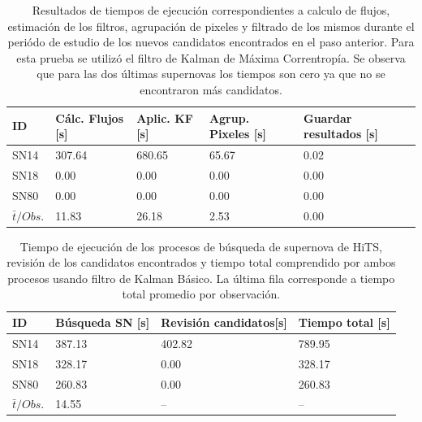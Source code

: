 \begin{table}[h!]
\centering
\begin{tabular}{|l|l|l|l|l|}
\hline
\textbf{ID} & \textbf{C\'alc. Flujos [s]} & \textbf{Aplic. KF [s]} &  \textbf{Agrup. Pixeles [s]}  & \textbf{Guardar resultados [s]}\\ \hline \hline
SN14        & 307.64            & 680.65        &  65.67 & 0.02 \\ \hline
SN18            & 0.00             & 0.00         &  0.00  & 0.00\\ \hline
SN80            & 0.00             & 0.00         &   0.00 & 0.00 \\ \hline \hline
$\bar{t}/Obs. $& 11.83 & 26.18 & 2.53 & 0.00\\\hline  
\end{tabular}
\label{tab:t4}
\caption{Resultados de tiempos de ejecuci\'on correspondientes a calculo de flujos, estimaci\'on de los filtros, agrupaci\'on de pixeles y filtrado de los mismos durante el peri\'odo de estudio de los nuevos candidatos encontrados en el paso anterior. Para esta prueba se utiliz\'o el filtro de Kalman de M\'axima Correntrop\'ia. Se observa que para las dos \'ultimas supernovas los tiempos son cero ya que no se encontraron m\'as candidatos.}
\end{table}

\begin{table}[h!]
\centering
\begin{tabular}{|l|l|l|l|}
\hline
\textbf{ID} & \textbf{B\'usqueda SN [s]} & \textbf{Revisi\'on candidatos[s]} & \textbf{Tiempo total [s]} \\ \hline
\hline
SN14 & 387.13 & 402.82 & 789.95 \\\hline
SN18 & 328.17 & 0.00 & 328.17\\\hline
SN80 & 260.83 & 0.00 & 260.83 \\\hline\hline
 $\bar{t}/Obs. $& 14.55 & -- & --\\\hline 
\end{tabular}
\label{tab:t5}
\caption{Tiempo de ejecuci\'on de los procesos de b\'usqueda de supernova de HiTS, revisi\'on de los candidatos encontrados y tiempo total comprendido por ambos procesos usando filtro de Kalman B\'asico. La \'ultima fila corresponde a tiempo total promedio por observaci\'on.}
\end{table}


